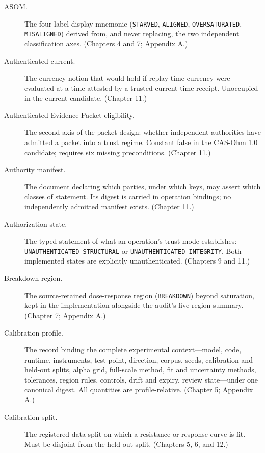 \begin{description}
\item[ASOM.] The four-label display mnemonic (\texttt{STARVED}, \texttt{ALIGNED}, \texttt{OVERSATURATED}, \texttt{MISALIGNED}) derived from, and never replacing, the two independent classification axes. (Chapters 4 and 7; Appendix A.)

\item[Authenticated-current.] The currency notion that would hold if replay-time currency were evaluated at a time attested by a trusted current-time receipt. Unoccupied in the current candidate. (Chapter 11.)

\item[Authenticated Evidence-Packet eligibility.] The second axis of the packet design: whether independent authorities have admitted a packet into a trust regime. Constant false in the CAS-Ohm 1.0 candidate; requires six missing preconditions. (Chapter 11.)

\item[Authority manifest.] The document declaring which parties, under which keys, may assert which classes of statement. Its digest is carried in operation bindings; no independently admitted manifest exists. (Chapter 11.)

\item[Authorization state.] The typed statement of what an operation's trust mode establishes: \texttt{UNAUTHENTICATED\_STRUCTURAL} or \texttt{UNAUTHENTICATED\_INTEGRITY}. Both implemented states are explicitly unauthenticated. (Chapters 9 and 11.)

\item[Breakdown region.] The source-retained dose-response region (\texttt{BREAKDOWN}) beyond saturation, kept in the implementation alongside the audit's five-region summary. (Chapter 7; Appendix A.)

\item[Calibration profile.] The record binding the complete experimental context---model, code, runtime, instruments, test point, direction, corpus, seeds, calibration and held-out splits, alpha grid, full-scale method, fit and uncertainty methods, tolerances, region rules, controls, drift and expiry, review state---under one canonical digest. All quantities are profile-relative. (Chapter 5; Appendix A.)

\item[Calibration split.] The registered data split on which a resistance or response curve is fit. Must be disjoint from the held-out split. (Chapters 5, 6, and 12.)


\end{description}

